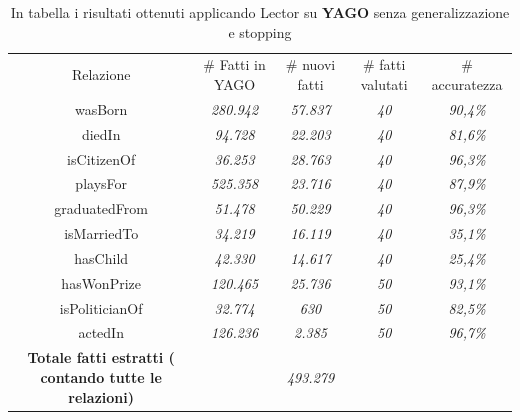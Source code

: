 \documentclass[twocolumn,10pt]{asme2ej}
\begin{document}
\begin{table}[h]
\vspace*{-145pt}
\centering
\caption{In tabella i risultati ottenuti applicando Lector su \textbf{YAGO} senza generalizzazione e stopping}
\begin{center}
\label{table_ASME}
\begin{tabular}{c c c c c}
& & \\ %
\hline
Relazione & \# Fatti in YAGO & \# nuovi fatti & \# fatti valutati & \# accuratezza \\
\hline
wasBorn &  \textit{280.942} &   \textit{57.837}  &  \textit{40} &  \textit{90,4\%} \\
diedIn &\textit{94.728} &   \textit{22.203} &  \textit{40} & \textit{81,6\%} \\
isCitizenOf & \textit{36.253} &   \textit{28.763} &  \textit{40} & \textit{96,3\%} \\
playsFor & \textit{525.358} &   \textit{23.716}  &  \textit{40} & \textit{87,9\%} \\
graduatedFrom & \textit{51.478} &   \textit{50.229}  &   \textit{40} & \textit{96,3\%} \\
isMarriedTo & \textit{34.219} &   \textit{16.119} &  \textit{40} & \textit{35,1\%} \\
hasChild & \textit{42.330} &   \textit{14.617}  &  \textit{40} & \textit{25,4\%} \\
hasWonPrize & \textit{120.465} &   \textit{25.736}  &  \textit{50} & \textit{93,1\%} \\
isPoliticianOf &\textit{32.774} &   \textit{630}  &  \textit{50}  & \textit{82,5\%} \\
actedIn &\textit{126.236} &   \textit{2.385}  &  \textit{50}  & \textit{96,7\%} \\
\hline
\textbf{Totale fatti estratti ( contando tutte le relazioni)} & &  \textit{493.279}  &    &  \\




\end{tabular}
\end{center}
\end{table}




%

\end{document}
